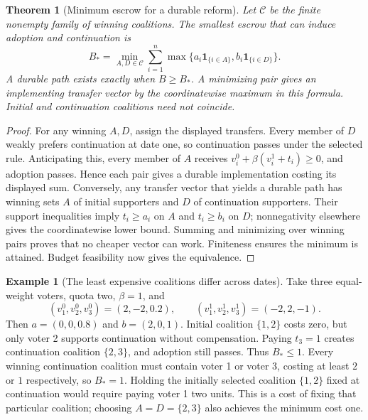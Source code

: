 \documentclass[11pt]{article}
\newtheorem{theorem}{Theorem}
\theoremstyle{definition}
\newtheorem{example}{Example}
\begin{document}
\begin{theorem}[Minimum escrow for a durable reform]
Let $\mathcal C$ be the finite nonempty family of winning coalitions. The smallest escrow that can induce adoption and continuation is
\[
 B_* =\min_{A,D\in\mathcal C}\sum_{i=1}^n
       \max\{a_i\mathbf1_{\{i\in A\}},
                   b_i\mathbf1_{\{i\in D\}}\}.
\]
A durable path exists exactly when $B\geq B_*$. A minimizing pair gives an implementing transfer vector by the coordinatewise maximum in this formula. Initial and continuation coalitions need not coincide.
\end{theorem}
\begin{proof}
For any winning $A,D$, assign the displayed transfers. Every member of $D$ weakly prefers continuation at date one, so continuation passes under the selected rule. Anticipating this, every member of $A$ receives $v_i^0+\beta(v_i^1+t_i)\geq0$, and adoption passes. Hence each pair gives a durable implementation costing its displayed sum.
Conversely, any transfer vector that yields a durable path has winning sets $A$ of initial supporters and $D$ of continuation supporters. Their support inequalities imply $t_i\geq a_i$ on $A$ and $t_i\geq b_i$ on $D$; nonnegativity elsewhere gives the coordinatewise lower bound. Summing and minimizing over winning pairs proves that no cheaper vector can work. Finiteness ensures the minimum is attained. Budget feasibility now gives the equivalence.
\end{proof}

\begin{example}[The least expensive coalitions differ across dates]
Take three equal-weight voters, quota two, $\beta=1$, and
\[
 (v_1^0,v_2^0,v_3^0)=(2,-2,0.2),\qquad
 (v_1^1,v_2^1,v_3^1)=(-2,2,-1).
\]
Then $a=(0,0,0.8)$ and $b=(2,0,1)$. Initial coalition $\{1,2\}$ costs zero, but only voter 2 supports continuation without compensation. Paying $t_3=1$ creates continuation coalition $\{2,3\}$, and adoption still passes. Thus $B_*\leq1$. Every winning continuation coalition must contain voter 1 or voter 3, costing at least $2$ or $1$ respectively, so $B_*=1$. Holding the initially selected coalition $\{1,2\}$ fixed at continuation would require paying voter 1 two units. This is a cost of fixing that particular coalition; choosing $A=D=\{2,3\}$ also achieves the minimum cost one.
\end{example}
\end{document}
